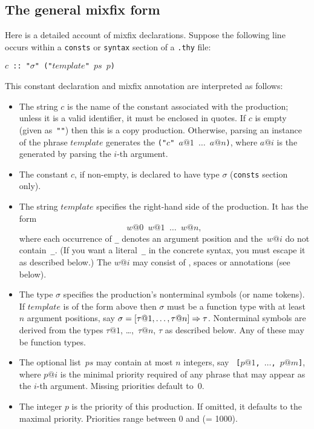 \subsection{The general mixfix form}
Here is a detailed account of mixfix declarations.  Suppose the following
line occurs within a {\tt consts} or {\tt syntax} section of a {\tt .thy}
file:
\begin{center}
  {\tt $c$ ::\ "$\sigma$" ("$template$" $ps$ $p$)}
\end{center}
This constant declaration and mixfix annotation are interpreted as follows:
\begin{itemize}
\item The string {\tt $c$} is the name of the constant associated with the
  production; unless it is a valid identifier, it must be enclosed in
  quotes.  If $c$ is empty (given as~{\tt ""}) then this is a copy
  production. Otherwise, parsing an instance of the
  phrase $template$ generates the \AST{} {\tt ("$c$" $a@1$ $\ldots$
    $a@n$)}, where $a@i$ is the \AST{} generated by parsing the $i$-th
  argument.

  \item The constant $c$, if non-empty, is declared to have type $\sigma$
    ({\tt consts} section only).

  \item The string $template$ specifies the right-hand side of
    the production.  It has the form
    \[ w@0 \;_\; w@1 \;_\; \ldots \;_\; w@n, \]
    where each occurrence of {\tt_} denotes an argument position and
    the~$w@i$ do not contain~{\tt _}.  (If you want a literal~{\tt _} in
    the concrete syntax, you must escape it as described below.)  The $w@i$
    may consist of , spaces or
     annotations (see below).

  \item The type $\sigma$ specifies the production's nonterminal symbols
    (or name tokens).  If $template$ is of the form above then $\sigma$
    must be a function type with at least~$n$ argument positions, say
    $\sigma = [\tau@1, \dots, \tau@n] \To \tau$.  Nonterminal symbols are
    derived from the types $\tau@1$, \ldots,~$\tau@n$, $\tau$ as described
    below.  Any of these may be function types.

  \item The optional list~$ps$ may contain at most $n$ integers, say {\tt
      [$p@1$, $\ldots$, $p@m$]}, where $p@i$ is the minimal
    priority required of any phrase that may appear
    as the $i$-th argument.  Missing priorities default to~0.
    
  \item The integer $p$ is the priority of this production.  If
    omitted, it defaults to the maximal priority.  Priorities range
    between 0 and  (= 1000).

\end{itemize}

